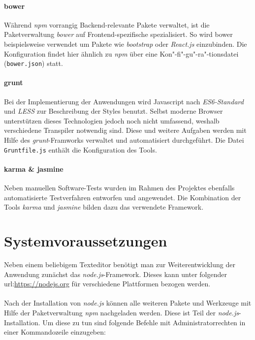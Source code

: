 \paragraph{bower}Während \textit{npm} vorrangig Backend-relevante Pakete verwaltet, ist die Paketverwaltung \textit{bower} auf Frontend-spezifische spezialisiert. So wird bower beispielsweise verwendet um Pakete wie \textit{bootstrap} oder \textit{React.js} einzubinden. Die Konfiguration findet hier ähnlich zu \textit{npm} über eine Kon"-fi"-gu"-ra"-tionsdatei (\texttt{bower.json}) statt.

\paragraph{grunt}Bei der Implementierung der Anwendungen wird Javascript nach \textit{ES6-Standard} und \textit{LESS} zur Beschreibung der Styles benutzt. Selbst moderne Browser unterstützen dieses Technologien jedoch noch nicht umfassend, weshalb verschiedene Transpiler notwendig sind. Diese und weitere Aufgaben werden mit Hilfe des \textit{grunt}-Framworks verwaltet und automatisiert durchgeführt. Die Datei \texttt{Gruntfile.js} enthält die Konfiguration des Tools.

\paragraph{karma \& jasmine}Neben manuellen Software-Tests wurden im Rahmen des Projektes ebenfalls automatisierte Testverfahren entworfen und angewendet. Die Kombination der Tools \textit{karma} und \textit{jasmine} bilden dazu das verwendete Framework.


\section{Systemvoraussetzungen}
Neben einem beliebigem Texteditor benötigt man zur Weiterentwicklung der Anwendung zunächst das \textit{node.js}-Framework. Dieses kann unter folgender url:\url{https://nodejs.org} für verschiedene Plattformen bezogen werden.

\paragraph{}Nach der Installation von \textit{node.js} können alle weiteren Pakete und Werkzeuge mit Hilfe der Paketverwaltung \textit{npm} nachgeladen werden. Diese ist Teil der \textit{node.js}-Installation. Um diese zu tun sind folgende Befehle mit Administratorrechten in einer Kommandozeile einzugeben:

